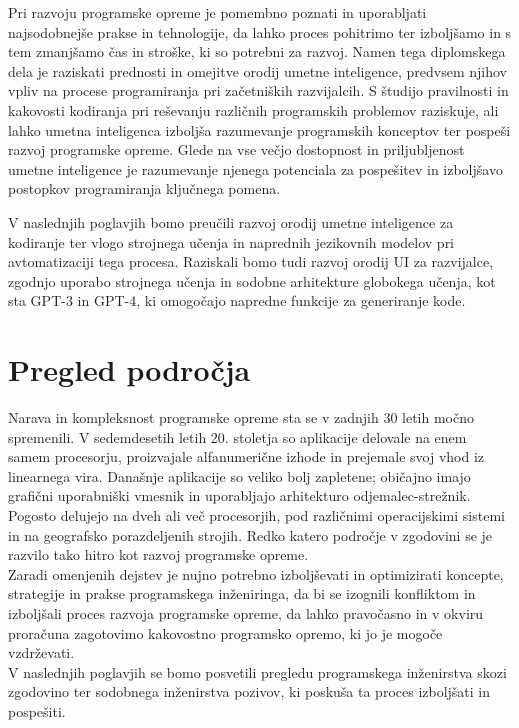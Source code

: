 \documentclass[a4paper,12pt,openright]{book}
\begin{document}
Pri razvoju programske opreme je pomembno poznati in uporabljati najsodobnejše prakse in tehnologije, da lahko proces pohitrimo ter izboljšamo in s tem zmanjšamo čas in stroške, ki so potrebni za razvoj.
Namen tega diplomskega dela je raziskati prednosti in omejitve orodij umetne inteligence, predvsem njihov vpliv na procese programiranja  pri začetniških razvijalcih. S študijo pravilnosti in kakovosti kodiranja pri reševanju različnih programskih problemov raziskuje, ali lahko umetna inteligenca izboljša razumevanje programskih konceptov ter pospeši razvoj programske opreme. Glede na vse večjo dostopnost in priljubljenost umetne inteligence je razumevanje njenega potenciala za pospešitev in izboljšavo postopkov programiranja ključnega pomena.

V naslednjih poglavjih bomo preučili razvoj orodij umetne inteligence za kodiranje ter vlogo strojnega učenja in naprednih jezikovnih modelov pri avtomatizaciji tega procesa. Raziskali bomo tudi razvoj orodij UI za razvijalce, zgodnjo uporabo strojnega učenja in sodobne arhitekture globokega učenja, kot sta GPT-3 in GPT-4, ki omogočajo napredne funkcije za generiranje kode.



\chapter{Pregled področja}
Narava in kompleksnost programske opreme sta se v zadnjih 30 letih močno spremenili. V sedemdesetih letih 20. stoletja so aplikacije delovale na enem samem procesorju, proizvajale alfanumerične izhode in prejemale svoj vhod iz linearnega vira. Današnje aplikacije so veliko bolj zapletene; običajno imajo grafični uporabniški vmesnik in uporabljajo arhitekturo odjemalec-strežnik. Pogosto delujejo na dveh ali več procesorjih, pod različnimi operacijskimi sistemi in na geografsko porazdeljenih strojih. Redko katero področje v zgodovini se je  razvilo tako hitro kot razvoj programske opreme. \cite{aggarwal2005software}
\\
Zaradi omenjenih dejstev je nujno potrebno izboljševati in optimizirati koncepte, strategije in prakse programskega inženiringa, da bi se izognili konfliktom in izboljšali proces razvoja programske opreme, da lahko pravočasno in v okviru proračuna zagotovimo kakovostno programsko opremo, ki jo je mogoče vzdrževati. \\
V naslednjih poglavjih se bomo posvetili pregledu programskega inženirstva skozi zgodovino ter sodobnega inženirstva pozivov, ki poskuša ta proces izboljšati in pospešiti. 
\pagebreak
\end{document}
